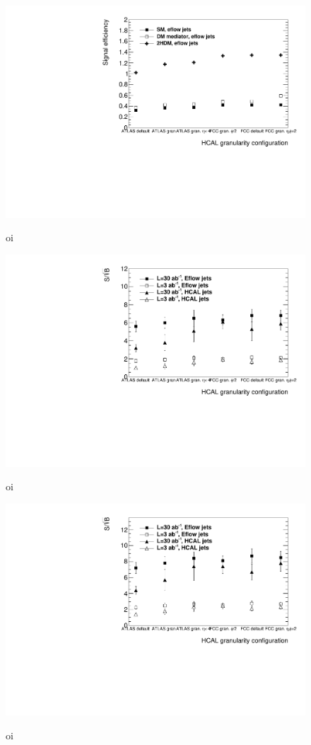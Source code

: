 \begin{figure}[h]
	\centering
	\includegraphics[width=\linewidth]{./images/EffvsGran_PFjets.pdf}
	\label{fig:eff_gran}
	\caption{oi}
\end{figure}

\begin{figure}[h]
	\centering
	\includegraphics[width=\linewidth]{./images/SSBvsGran_SM.pdf}
	\label{fig:SSB_gran}
	\caption{oi}
\end{figure}

\begin{figure}[h]
	\centering
	\includegraphics[width=\linewidth]{./images/SSBvsGran_2HDM.pdf}
	\label{fig:SSB_gran_2HDM}
	\caption{oi}
\end{figure}


